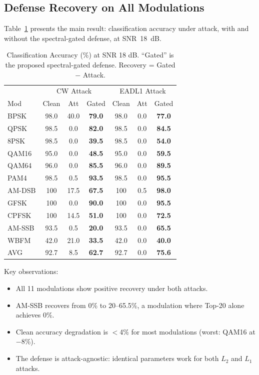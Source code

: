 \documentclass[letterpaper,twocolumn,10pt]{article}
\begin{document}
\subsection{Defense Recovery on All Modulations}

Table~\ref{tab:main} presents the main result: classification
accuracy under attack, with and without the spectral-gated defense,
at SNR~18~dB.

\begin{table}[t]
\caption{Classification Accuracy (\%) at SNR 18 dB. ``Gated'' is the
  proposed spectral-gated defense. Recovery = Gated $-$ Attack.}
\label{tab:main}
\centering
\small
\begin{tabular}{lccc|ccc}
\toprule
 & \multicolumn{3}{c|}{CW Attack} & \multicolumn{3}{c}{EADL1 Attack} \\
Mod & Clean & Att & Gated & Clean & Att & Gated \\
\midrule
BPSK  & 98.0 & 40.0 & \textbf{79.0} & 98.0 &  0.0 & \textbf{77.0} \\
QPSK  & 98.5 &  0.0 & \textbf{82.0} & 98.5 &  0.0 & \textbf{84.5} \\
8PSK  & 98.5 &  0.0 & \textbf{39.5} & 98.5 &  0.0 & \textbf{54.0} \\
QAM16 & 95.0 &  0.0 & \textbf{48.5} & 95.0 &  0.0 & \textbf{59.5} \\
QAM64 & 96.0 &  0.0 & \textbf{85.5} & 96.0 &  0.0 & \textbf{89.5} \\
PAM4  & 98.5 &  0.5 & \textbf{93.5} & 98.5 &  0.0 & \textbf{95.5} \\
AM-DSB& 100  & 17.5 & \textbf{67.5} & 100  &  0.5 & \textbf{98.0} \\
GFSK  & 100  &  0.0 & \textbf{90.0} & 100  &  0.0 & \textbf{95.5} \\
CPFSK & 100  & 14.5 & \textbf{51.0} & 100  &  0.0 & \textbf{72.5} \\
AM-SSB& 93.5 &  0.5 & \textbf{20.0} & 93.5 &  0.0 & \textbf{65.5} \\
WBFM  & 42.0 & 21.0 & \textbf{33.5} & 42.0 &  0.0 & \textbf{40.0} \\
\midrule
AVG   & 92.7 &  8.5 & \textbf{62.7} & 92.7 &  0.0 & \textbf{75.6} \\
\bottomrule
\end{tabular}
\end{table}

Key observations:
\begin{itemize}
\item All 11 modulations show positive recovery under both attacks.
\item AM-SSB recovers from 0\% to 20--65.5\%, a modulation where
  Top-20 alone achieves 0\%.
\item Clean accuracy degradation is $<$4\% for most modulations
  (worst: QAM16 at $-$8\%).
\item The defense is attack-agnostic: identical parameters work
  for both $L_2$ and $L_1$ attacks.
\end{itemize}
\end{document}
